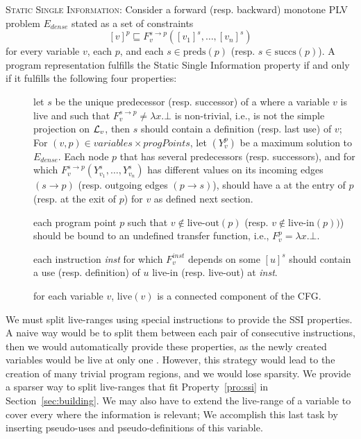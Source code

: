{\begin{property}[SSI]
\label{pro:ssi}\textsc{Static Single Information:}
Consider a forward (resp.  backward) monotone PLV problem $E_\textit{dense}$ 
stated as a set of constraints
$$[v]^p \sqsubseteq F_v^{s\to p}([v_1]^s,\dots,[v_n]^s)$$
for every variable $v$, each \progpoint $p$, and each $s \in \textrm{preds}(p)$ 
(resp.  $s\in \textrm{succs}(p)$).
A program representation fulfills the Static Single Information property if and 
only if it fulfills the following four properties:

\begin{description}
\item[\bf\psplit] let $s$ be the unique predecessor (resp. successor) of 
  a \progpoint where a variable $v$ is live and such that $F_v^{s\to p}\neq 
  \lambda x.\bot$ is non-trivial, i.e., is not the simple projection on ${\cal 
  L}_v$, then $s$ should contain a definition (resp. last use) of $v$;
  For ${(v,p)\in \textit{variables}\times \textit{progPoints}}$, let $(Y_v^p)$
  be a maximum solution to $E_\textit{dense}$.  Each node $p$ that has several 
  predecessors (resp. successors), and for which $F_v^{s\to 
  p}(Y_{v_1}^s,\dots,Y_{v_n}^s)$ has different values on its incoming edges 
  $(s\to p)$ (resp. outgoing edges $(p\to s)$), should have a \phifun at the 
  entry of $p$ (resp. \sigmafun at the exit of $p$) for $v$
  as defined next section.\\[-1em]

\item[\bf \pinfo] each program point $p$ such that $v\not\in 
    \textrm{live-out}(p)$ (resp. $v\not\in \textrm{live-in}(p))$)  should be 
    bound to an undefined  transfer function, i.e., $F_v^p=\lambda 
    x.\bot$.\\[-1em]

\item[\bf \plink] each instruction \textit{inst} for which 
  $F_v^{\textit{inst}}$ depends on some $[u]^s$ should contain a use (resp.  
  definition) of $u$ live-in (resp. live-out) at \textit{inst}.\\[-1em]

\item[\bf \pversion] for each variable $v$, $\textrm{live}(v)$ is a connected 
  component of the CFG.
\end{description}
\end{property}

We must split live-ranges using special instructions to provide the SSI 
properties.
A naive way would be to split them between each pair of consecutive 
instructions, then we would automatically provide these properties, as the 
newly created variables would be live at only one \progpoint.
However, this strategy would lead to the creation of many trivial program regions, and we would lose sparsity.
We provide a sparser way to split live-ranges that fit Property~\ref{pro:ssi} 
in Section~\ref{sec:building}.
We may also have to extend the live-range of a variable to cover every 
\progpoint where the information is relevant;
We accomplish this last task by inserting pseudo-uses and pseudo-definitions of 
this variable.

}
